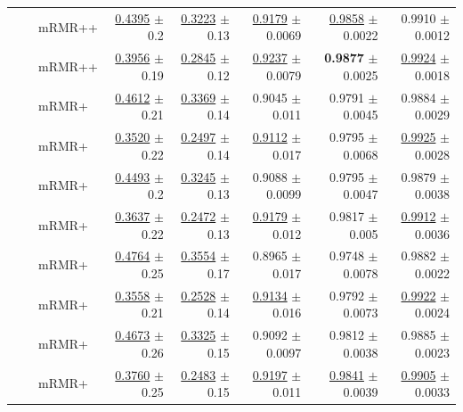 \begin{longtable}{llp{}rrrrr}
 &  & mRMR++ & \underline{0.4395} {\scriptsize $\pm$ 0.2} & \underline{0.3223} {\scriptsize $\pm$ 0.13} & \underline{0.9179} {\scriptsize $\pm$ 0.0069} & \underline{0.9858} {\scriptsize $\pm$ 0.0022} & 0.9910 {\scriptsize $\pm$ 0.0012} \\
 &  & mRMR++ & \underline{0.3956} {\scriptsize $\pm$ 0.19} & \underline{0.2845} {\scriptsize $\pm$ 0.12} & \underline{0.9237} {\scriptsize $\pm$ 0.0079} & \textbf{0.9877} {\scriptsize $\pm$ 0.0025} & \underline{0.9924} {\scriptsize $\pm$ 0.0018} \\
 &  & mRMR+ & \underline{0.4612} {\scriptsize $\pm$ 0.21} & \underline{0.3369} {\scriptsize $\pm$ 0.14} & 0.9045 {\scriptsize $\pm$ 0.011} & 0.9791 {\scriptsize $\pm$ 0.0045} & 0.9884 {\scriptsize $\pm$ 0.0029} \\
 &  & mRMR+ & \underline{0.3520} {\scriptsize $\pm$ 0.22} & \underline{0.2497} {\scriptsize $\pm$ 0.14} & \underline{0.9112} {\scriptsize $\pm$ 0.017} & 0.9795 {\scriptsize $\pm$ 0.0068} & \underline{0.9925} {\scriptsize $\pm$ 0.0028} \\
 &  & mRMR+ & \underline{0.4493} {\scriptsize $\pm$ 0.2} & \underline{0.3245} {\scriptsize $\pm$ 0.13} & 0.9088 {\scriptsize $\pm$ 0.0099} & 0.9795 {\scriptsize $\pm$ 0.0047} & 0.9879 {\scriptsize $\pm$ 0.0038} \\
 &  & mRMR+ & \underline{0.3637} {\scriptsize $\pm$ 0.22} & \underline{0.2472} {\scriptsize $\pm$ 0.13} & \underline{0.9179} {\scriptsize $\pm$ 0.012} & 0.9817 {\scriptsize $\pm$ 0.005} & \underline{0.9912} {\scriptsize $\pm$ 0.0036} \\
 &  & mRMR+ & \underline{0.4764} {\scriptsize $\pm$ 0.25} & \underline{0.3554} {\scriptsize $\pm$ 0.17} & 0.8965 {\scriptsize $\pm$ 0.017} & 0.9748 {\scriptsize $\pm$ 0.0078} & 0.9882 {\scriptsize $\pm$ 0.0022} \\
 &  & mRMR+ & \underline{0.3558} {\scriptsize $\pm$ 0.21} & \underline{0.2528} {\scriptsize $\pm$ 0.14} & \underline{0.9134} {\scriptsize $\pm$ 0.016} & 0.9792 {\scriptsize $\pm$ 0.0073} & \underline{0.9922} {\scriptsize $\pm$ 0.0024} \\
 &  & mRMR+ & \underline{0.4673} {\scriptsize $\pm$ 0.26} & \underline{0.3325} {\scriptsize $\pm$ 0.15} & 0.9092 {\scriptsize $\pm$ 0.0097} & 0.9812 {\scriptsize $\pm$ 0.0038} & 0.9885 {\scriptsize $\pm$ 0.0023} \\
 &  & mRMR+ & \underline{0.3760} {\scriptsize $\pm$ 0.25} & \underline{0.2483} {\scriptsize $\pm$ 0.15} & \underline{0.9197} {\scriptsize $\pm$ 0.011} & \underline{0.9841} {\scriptsize $\pm$ 0.0039} & \underline{0.9905} {\scriptsize $\pm$ 0.0033} \\

\end{longtable}
